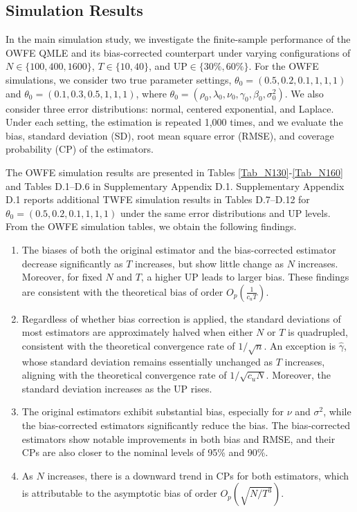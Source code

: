 \documentclass[11pt,a4paper]{article}
\begin{document}
\subsection{Simulation Results}

In the main simulation study, we investigate the finite-sample performance of the OWFE QMLE and its bias-corrected counterpart under varying configurations of $N \in \{100, 400, 1600\}$, $T \in \{10, 40\}$, and $\mathrm{UP}\in \{30\%, 60\%\}$. 
For the OWFE simulations, we consider two true parameter settings, $\theta_0=(0.5,0.2,0.1,1,1,1)$ and $\theta_0=(0.1,0.3,0.5,1,1,1)$, where $\theta_0=(\rho_0,\lambda_0,\nu_0,\gamma_0,\beta_0,\sigma^2_0)$. We also consider three error distributions: normal, centered exponential, and Laplace.
Under each setting, the estimation is repeated 1,000 times, and we evaluate the bias, standard deviation (SD), root mean square error (RMSE), and coverage probability (CP) of the estimators.

The OWFE simulation results are presented in Tables \ref{Tab_N130}-\ref{Tab_N160} and Tables D.1--D.6 in Supplementary Appendix D.1. 
Supplementary Appendix D.1 reports additional TWFE simulation results in Tables D.7--D.12 for \(\theta_0=(0.5,0.2,0.1,1,1,1)\) under the same error distributions and UP levels.
From the OWFE simulation tables, we obtain the following findings. 
\begin{enumerate}[(1)]
\item The biases of both the original estimator and the bias-corrected estimator decrease significantly as $T$ increases, but show little change as $N$ increases. Moreover, for fixed $N$ and $T$, a higher UP leads to larger bias. These findings are consistent with the theoretical bias of order $O_p(\frac{1}{c_u T})$.
\item Regardless of whether bias correction is applied, the standard deviations of most estimators are approximately halved when either $N$ or $T$ is quadrupled, consistent with the theoretical convergence rate of $1/\sqrt{n}$. An exception is $\hat{\gamma}$, whose standard deviation remains essentially unchanged as $T$ increases, aligning with the theoretical convergence rate of $1/\sqrt{c_uN}$.
Moreover, the standard deviation increases as the UP rises.
\item The original estimators exhibit substantial bias, especially for $\nu$ and $\sigma^2$, while the bias-corrected estimators significantly reduce the bias. The bias-corrected estimators show notable improvements in both bias and RMSE, and their CPs are also closer to the nominal levels of 95\% and 90\%. %
\item As $N$ increases, there is a downward trend in CPs for both estimators, which is attributable to the asymptotic bias of order $O_p(\sqrt{N/T^3})$.
\end{enumerate}
\end{document}
